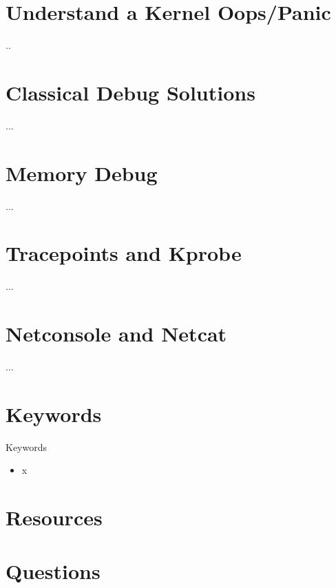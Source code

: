 \documentclass{workshop}
\begin{document}
\section{Understand a Kernel Oops/Panic}
\begin{frame}{..}
\end{frame}

\section{Classical Debug Solutions}
\begin{frame}{...}
\end{frame}

\section{Memory Debug}
\begin{frame}{...}
\end{frame}

\section{Tracepoints and Kprobe}
\begin{frame}{...}
\end{frame}

\section{Netconsole and Netcat}
\begin{frame}{...}
\end{frame}

\section{Keywords}
\begin{frame}{Keywords}
      \begin{itemize}
        \item x
      \end{itemize}
\end{frame}

\section{Resources}

\section{Questions}
\end{document}
